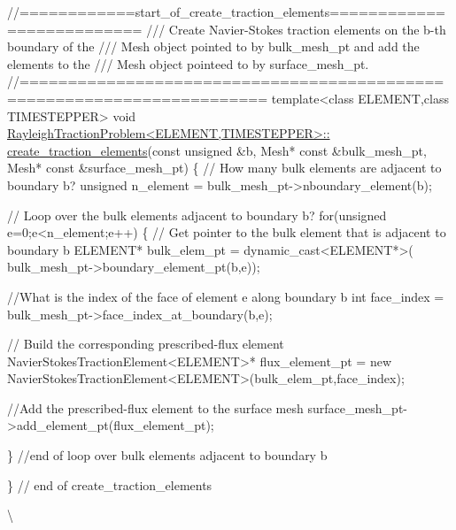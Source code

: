 \begin{DoxyCodeInclude}
\textcolor{comment}{//============start\_of\_create\_traction\_elements==========================}
\textcolor{comment}{/// Create Navier-Stokes traction elements on the b-th boundary of the}
\textcolor{comment}{}\textcolor{comment}{/// Mesh object pointed to by bulk\_mesh\_pt and add the elements to the }
\textcolor{comment}{}\textcolor{comment}{/// Mesh object pointeed to by surface\_mesh\_pt.}
\textcolor{comment}{}\textcolor{comment}{//=======================================================================}
\textcolor{keyword}{template}<\textcolor{keyword}{class} ELEMENT,\textcolor{keyword}{class} TIMESTEPPER>
\textcolor{keywordtype}{void} \hyperlink{classRayleighTractionProblem_a3a94c245abf443c436eb8a94be19a9f9}{RayleighTractionProblem<ELEMENT,TIMESTEPPER>::}
\hyperlink{classRayleighTractionProblem_a3a94c245abf443c436eb8a94be19a9f9}{create\_traction\_elements}(\textcolor{keyword}{const} \textcolor{keywordtype}{unsigned} &b, Mesh* \textcolor{keyword}{const} &bulk\_mesh\_pt,
                         Mesh* \textcolor{keyword}{const} &surface\_mesh\_pt)
\{
 \textcolor{comment}{// How many bulk elements are adjacent to boundary b?}
 \textcolor{keywordtype}{unsigned} n\_element = bulk\_mesh\_pt->nboundary\_element(b);

 \textcolor{comment}{// Loop over the bulk elements adjacent to boundary b?}
 \textcolor{keywordflow}{for}(\textcolor{keywordtype}{unsigned} e=0;e<n\_element;e++)
  \{
   \textcolor{comment}{// Get pointer to the bulk element that is adjacent to boundary b}
   ELEMENT* bulk\_elem\_pt = \textcolor{keyword}{dynamic\_cast<}ELEMENT*\textcolor{keyword}{>}(
    bulk\_mesh\_pt->boundary\_element\_pt(b,e));
   
   \textcolor{comment}{//What is the index of the face of element e along boundary b}
   \textcolor{keywordtype}{int} face\_index = bulk\_mesh\_pt->face\_index\_at\_boundary(b,e);

   \textcolor{comment}{// Build the corresponding prescribed-flux element}
   NavierStokesTractionElement<ELEMENT>* flux\_element\_pt = \textcolor{keyword}{new} 
    NavierStokesTractionElement<ELEMENT>(bulk\_elem\_pt,face\_index);
   
   \textcolor{comment}{//Add the prescribed-flux element to the surface mesh}
   surface\_mesh\_pt->add\_element\_pt(flux\_element\_pt);

  \} \textcolor{comment}{//end of loop over bulk elements adjacent to boundary b}

\} \textcolor{comment}{// end of create\_traction\_elements}

\end{DoxyCodeInclude}
 \textbackslash{} 

